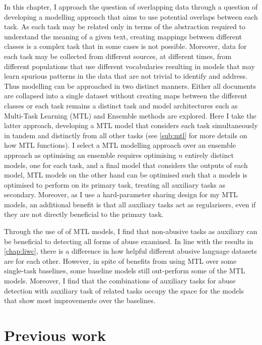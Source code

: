 In this chapter, I approach the question of overlapping data through a question of developing a modelling approach that aims to use potential overlaps between each task.
As each task may be related only in terms of the abstraction required to understand the meaning of a given text, creating mappings between different classes is a complex task that in some cases is not possible.
Moreover, data for each task may be collected from different sources, at different times, from different populations that use different vocabularies resulting in models that may learn spurious patterns in the data that are not trivial to identify and address.
Thus modelling can be approached in two distinct manners. Either all documents are collapsed into a single dataset without creating maps between the different classes or each task remains a distinct task and model architectures such as Multi-Task Learning (MTL) and Ensemble methods are explored.
Here I take the latter approach, developing a MTL model that considers each task simultaneously in tandem and distinctly from all other tasks (see \cref{sub:mtl} for more details on how MTL functions).
I select a MTL modelling approach over an ensemble approach as optimising an ensemble requires optimising $n$ entirely distinct models, one for each task, and a final model that considers the outputs of each model, MTL models on the other hand can be optimised such that a models is optimised to perform on its primary task, treating all auxiliary tasks as secondary.
Moreover, as I use a hard-parameter sharing design for my MTL models, an additional benefit is that all auxiliary tasks act as regularisers, even if they are not directly beneficial to the primary task.

Through the use of of MTL models, I find that non-abusive tasks as auxiliary can be beneficial to detecting all forms of abuse examined.
In line with the results in \cref{chap:liwc}, there is a difference in how helpful different abusive language datasets are for each other.
However, in spite of benefits from using MTL over some single-task baselines, some baseline models still out-perform some of the MTL models.
Moreover, I find that the combinations of auxiliary tasks for abuse detection with auxiliary task of related tasks occupy the space for the models that show most improvements over the baselines.

\section{Previous work}

